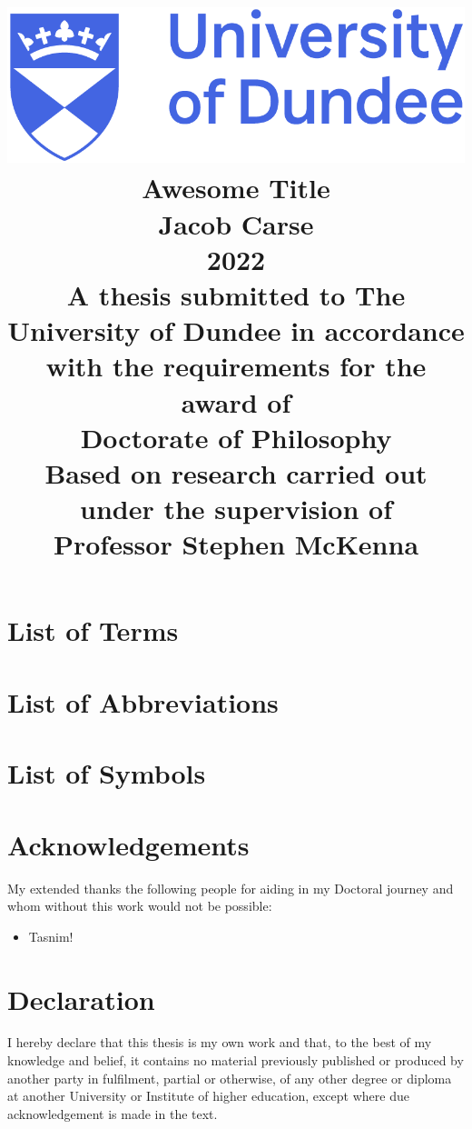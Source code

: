\documentclass[12pt]{report}
\title{
	{\includegraphics[scale=0.4]{dundee_logo.png}}\\
	\vspace{15mm}
	{Awesome Title}\\
	\vspace{5mm}
	{\Large Jacob Carse}\\
	{\Large 2022}\\
	\vspace{5mm}
	{\normalsize A thesis submitted to The University of Dundee in accordance with the requirements for the award of}\\
	{\large Doctorate of Philosophy}\\
	\vspace{5mm}
	{\normalsize Based on research carried out under the supervision of}\\
	{\large Professor Stephen McKenna}
}
\date{\vspace{-5ex}}
\author{}
\begin{document}
	
	\maketitle
	
	\tableofcontents
	\listoffigures
	\listoftables
	
	\chapter*{List of Terms}
	
	
	\chapter*{List of Abbreviations}
	
	
	\chapter*{List of Symbols}
	
	
	\chapter*{Acknowledgements}
	My extended thanks the following people for aiding in my Doctoral journey and whom without this work would not be possible:
	
	\begin{itemize}
		\item Tasnim!
	\end{itemize}
	
	\chapter*{Declaration}
	I hereby declare that this thesis is my own work and that, to the best of my knowledge and belief, it contains no material previously published or produced by another party in fulfilment, partial or otherwise, of any other degree or diploma at another University or Institute of higher education, except where due acknowledgement is made in the text.
	
\end{document}

